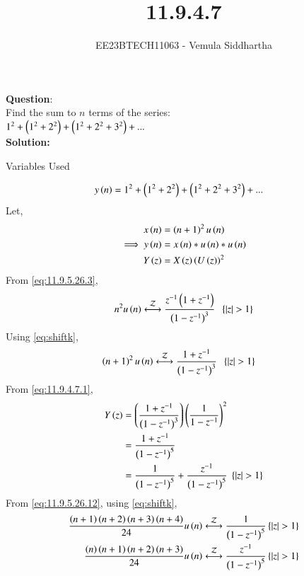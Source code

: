 \documentclass[journal,12pt,twocolumn]{IEEEtran}
\theoremstyle{remark}
\begin{document}

\vspace{3cm}

\title{11.9.4.7}
\author{EE23BTECH11063 - Vemula Siddhartha
}
\maketitle
\newpage
\bigskip

\renewcommand{\thefigure}{\theenumi}
\renewcommand{\thetable}{\theenumi}
\textbf{Question}:\\
Find the sum to $n$ terms of the series:\\
    $1^2+\left(1^2+2^2\right)+\left(1^2+2^2+3^2\right)+...$
    \\
\textbf{Solution:}
\begin{table}[h!]    
    \centering
    
    \caption{Variables Used}
    \label{tab10.5.3.9.1}
  \end{table}
\begin{align}
    y\left(n\right)&=1^2+\left(1^2+2^2\right)+\left(1^2+2^2+3^2\right)+...
\end{align}
Let,
\begin{align}
    x\left(n\right)&=\left(n+1\right)^2u\left(n\right)\\
    \implies y\left(n\right)&=x\left(n\right)*u\left(n\right)*u\left(n\right)\\
    Y\left(z\right)&=X\left(z\right)\left(U\left(z\right)\right)^2
\end{align}
From \eqref{eq:11.9.5.26.3},
\begin{align}
    n^2u\brak{n}\system{Z}\frac{z^{-1}\brak{1+z^{-1}}}{\brak{1-z^{-1}}^3}\;\;\cbrak{\abs{z}>1}
\end{align}
Using \eqref{eq:shiftk},
\begin{align}
    \brak{n+1}^2u\brak{n}&\system{Z}\frac{1+z^{-1}}{\brak{1-z^{-1}}^3}\;\;\cbrak{\abs{z}>1}\label{eq:11.9.4.7.1}
\end{align}
From \eqref{eq:11.9.4.7.1},
\begin{align}
    Y\left(z\right)&=\left(\frac{1+z^{-1}}{\left(1-z^{-1}\right)^3}\right)\left(\frac{1}{1-z^{-1}}\right)^2\\
    &=\frac{1+z^{-1}}{\left(1-z^{-1}\right)^5}\\
    &=\frac{1}{\left(1-z^{-1}\right)^5}+\frac{z^{-1}}{\left(1-z^{-1}\right)^5}\;\left\{\left\vert z\right\vert>1\right\}
\end{align}
From \eqref{eq:11.9.5.26.12}, using \eqref{eq:shiftk},
\begin{align}
    \frac{\brak{n+1}\brak{n+2}\brak{n+3}\brak{n+4}}{24}u\brak{n}&\system{Z}\frac{1}{\brak{1-z^{-1}}^5}\label{eq:11.9.4.7.2}\cbrak{\abs{z}>1}\\
    \frac{\brak{n}\brak{n+1}\brak{n+2}\brak{n+3}}{24}u\brak{n}&\system{Z}\frac{z^{-1}}{\brak{1-z^{-1}}^5}\label{eq:11.9.4.7.3}\cbrak{\abs{z}>1}
\end{align}
\end{document}
